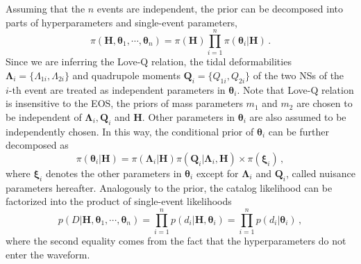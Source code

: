 \documentclass[a4paper,11pt]{article}
\begin{document}
Assuming that the $n$ events are independent, the 
prior can be decomposed into parts of hyperparameters and single-event parameters,
\begin{equation}
\label{bayes3}
\pi(\bm{H},\bm{\theta}_1,\cdots,\bm{\theta}_n) = \pi(\bm{H}) \prod_{i=1}^n \pi(\bm{\theta}_i|\bm{H})\,.
\end{equation}
Since we are inferring the Love-Q relation, the tidal deformabilities $\bm
{\Lambda}_i=\{\Lambda_{1i},\Lambda_{2i}\}$ and quadrupole moments $\bm{Q}_i=\{Q_
{1i},Q_{2i}\}$ of the two NSs of the $i\text{-th}$ event are treated as independent
parameters in $\bm{\theta}_i$. Note that Love-Q relation is insensitive 
to the EOS, the priors of mass parameters $m_1$ and $m_2$ are chosen to be
independent of $\bm{\Lambda}_i, \bm{Q}_i$ and $\bm{H}$. Other parameters in
$\bm{\theta}_i$ are also assumed to be independently chosen. 
In this way, the conditional prior of $\bm{\theta}_i$
 can be further decomposed as
\begin{equation}
\label{prior}
\pi(\bm{\theta}_i|\bm{H})=\pi(\bm{\Lambda}_i|\bm{H})\pi(\bm{Q}_i|\bm{\Lambda}_i,\bm{H})\times\pi(\bm{\xi}_i)\,,
\end{equation}
where $\bm{\xi}_i$ denotes the other parameters in $\bm{\theta}_i$ except for
$\bm{\Lambda}_i$ and $\bm{Q}_i$, called nuisance parameters hereafter.
Analogously to the prior, the catalog likelihood can be factorized
 into the product of single-event likelihoods
\begin{equation}
    p(D|\bm{H},\bm{\theta}_1,\cdots,\bm{\theta}_n)=\prod_{i=1}^{n}p(d_i|\bm{H},\bm{\theta}_i)=\prod_{i=1}^{n}p(d_i|\bm{\theta}_i)\,,\label{eq:catalog_likelihood}
\end{equation}
where the second equality comes from the fact that the hyperparameters do not enter the waveform.
\end{document}
